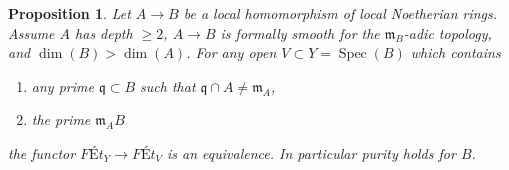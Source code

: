 \documentclass{stacks-project}
\theoremstyle{plain}
\newtheorem{proposition}[subsection]{Proposition}
\theoremstyle{definition}
\theoremstyle{remark}
\numberwithin{equation}{subsection}
\def\Spec{\mathop{\mathrm{Spec}}}
\begin{document}
\begin{proposition}
\label{proposition-purity-smooth-over-depth2}
Let $A \to B$ be a local homomorphism of local Noetherian rings.
Assume $A$ has depth $\geq 2$, $A \to B$ is formally smooth for the
$\mathfrak m_B$-adic topology, and $\dim(B) > \dim(A)$. For any open
$V \subset Y = \Spec(B)$ which contains
\begin{enumerate}
\item any prime $\mathfrak q \subset B$ such that
$\mathfrak q \cap A \not = \mathfrak m_A$,
\item the prime $\mathfrak m_A B$
\end{enumerate}
the functor $\textit{F\'Et}_Y \to \textit{F\'Et}_V$
is an equivalence. In particular purity holds for $B$.
\end{proposition}
\end{document}
